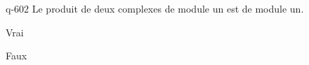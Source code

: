 \begin{truefalse}{q-602}
Le produit de deux complexes de module un est de module un.
\item* Vrai
\item Faux
\end{truefalse}

